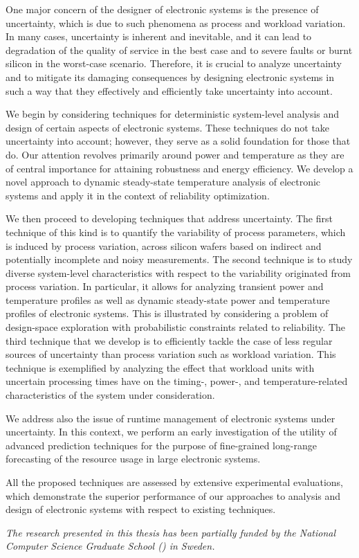 One major concern of the designer of electronic systems is the presence of
uncertainty, which is due to such phenomena as process and workload variation.
In many cases, uncertainty is inherent and inevitable, and it can lead to
degradation of the quality of service in the best case and to severe faults or
burnt silicon in the worst-case scenario. Therefore, it is crucial to analyze
uncertainty and to mitigate its damaging consequences by designing electronic
systems in such a way that they effectively and efficiently take uncertainty
into account.

We begin by considering techniques for deterministic system-level analysis and
design of certain aspects of electronic systems. These techniques do not take
uncertainty into account; however, they serve as a solid foundation for those
that do. Our attention revolves primarily around power and temperature as they
are of central importance for attaining robustness and energy efficiency. We
develop a novel approach to dynamic steady-state temperature analysis of
electronic systems and apply it in the context of reliability optimization.

We then proceed to developing techniques that address uncertainty. The first
technique of this kind is to quantify the variability of process parameters,
which is induced by process variation, across silicon wafers based on indirect
and potentially incomplete and noisy measurements. The second technique is to
study diverse system-level characteristics with respect to the variability
originated from process variation. In particular, it allows for analyzing
transient power and temperature profiles as well as dynamic steady-state power
and temperature profiles of electronic systems. This is illustrated by
considering a problem of design-space exploration with probabilistic constraints
related to reliability. The third technique that we develop is to efficiently
tackle the case of less regular sources of uncertainty than process variation
such as workload variation. This technique is exemplified by analyzing the
effect that workload units with uncertain processing times have on the timing-,
power-, and temperature-related characteristics of the system under
consideration.

We address also the issue of runtime management of electronic systems under
uncertainty. In this context, we perform an early investigation of the utility
of advanced prediction techniques for the purpose of fine-grained long-range
forecasting of the resource usage in large electronic systems.

All the proposed techniques are assessed by extensive experimental evaluations,
which demonstrate the superior performance of our approaches to analysis and
design of electronic systems with respect to existing techniques.

\vspace{1em}
\noindent
\emph{
  The research presented in this thesis has been partially funded by the
  National Computer Science Graduate School () in Sweden.
}
